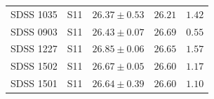 \begin{table}
\begin{tabular}{llccc}
        SDSS 1035        &  S11                 & $26.37 \pm 0.53$                  & $26.21$                          &  $1.42$ \\
        SDSS 0903        &  S11                 & $26.43 \pm 0.07$                  & $26.69$                          &  $0.55$ \\
        SDSS 1227        &  S11                 & $26.85 \pm 0.06$                  & $26.65$                          &  $1.57$ \\
        SDSS 1502        &  S11                 & $26.67 \pm 0.05$                  & $26.60$                          &  $1.17$ \\
        SDSS 1501        &  S11                 & $26.64 \pm 0.39$                  & $26.60$                          &  $1.10$ \\

\end{tabular}
\end{table}
